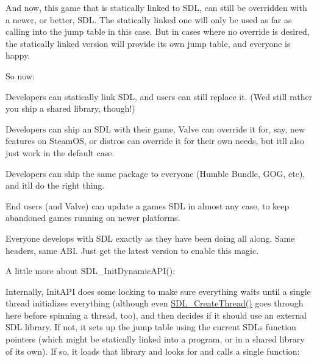 And now, this game that is statically linked to SDL, can still be overridden with a newer, or better, SDL. The statically linked one will only be used as far as calling into the jump table in this case. But in cases where no override is desired, the statically linked version will provide its own jump table, and everyone is happy.

So now\+:
\begin{DoxyItemize}
\item Developers can statically link SDL, and users can still replace it. (We\textquotesingle{}d still rather you ship a shared library, though!)
\item Developers can ship an SDL with their game, Valve can override it for, say, new features on Steam\+OS, or distros can override it for their own needs, but it\textquotesingle{}ll also just work in the default case.
\item Developers can ship the same package to everyone (Humble Bundle, GOG, etc), and it\textquotesingle{}ll do the right thing.
\item End users (and Valve) can update a game\textquotesingle{}s SDL in almost any case, to keep abandoned games running on newer platforms.
\item Everyone develops with SDL exactly as they have been doing all along. Same headers, same ABI. Just get the latest version to enable this magic.
\end{DoxyItemize}

A little more about SDL\+\_\+\+Init\+Dynamic\+API()\+:

Internally, Init\+API does some locking to make sure everything waits until a single thread initializes everything (although even \mbox{\hyperlink{_s_d_l__thread_8h_ac36c70a33975a8c9399962f8ac310377}{SDL\+\_\+\+Create\+Thread()}} goes through here before spinning a thread, too), and then decides if it should use an external SDL library. If not, it sets up the jump table using the current SDL\textquotesingle{}s function pointers (which might be statically linked into a program, or in a shared library of its own). If so, it loads that library and looks for and calls a single function\+:


\begin{DoxyCode}{0}

\end{DoxyCode}


